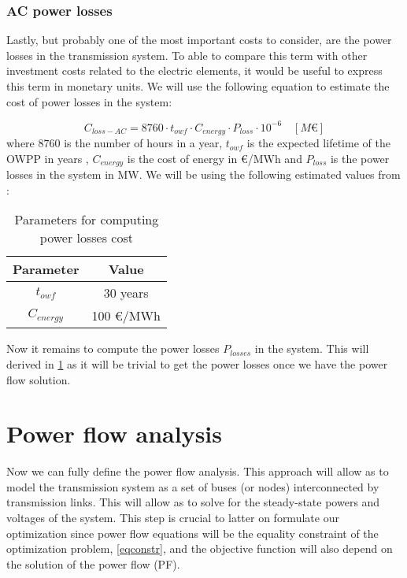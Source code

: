 \documentclass[a4paper,11pt, titlepage, twoside]{article}
\begin{document}
\subsubsection{AC power losses}
Lastly, but probably one of the most important costs to consider, are the power losses in the transmission system. To able to compare this term with other investment costs related to the electric elements,
it would be useful to express this term in monetary units. We will use the following equation to estimate the cost of power losses in the system:

\begin{equation}\label{eq:lossescost}
    C_{loss-AC} = 8760 \cdot t_{owf} \cdot C_{energy} \cdot P_{loss} \cdot 10^{-6} \quad \left[M\euro\right]
\end{equation}
where $8760$ is the number of hours in a year, $t_{owf}$ is the expected lifetime of the OWPP in years , $C_{energy}$ is the cost of energy in \euro/MWh and $P_{loss}$ is the power losses in the system in MW. We will be using the
following estimated values from \cite{paperbase}:
\begin{table}[h]
    \centering
    \begin{tabular}{c|c}
    \hline
    \textbf{Parameter} & \textbf{Value} \\
    \hline
    $t_{owf}$ & 30 years \\ 
    $C_{energy}$ & 100 \euro/MWh  \\
    \hline
    \end{tabular}
    \caption{Parameters for computing power losses cost \cite{paperbase}}
    \label{tab:lossescost}
\end{table}

Now it remains to compute the power losses $P_{losses}$ in the system. This will derived in \ref{fulltransmission} as it will be trivial to get
the power losses once we have the power flow solution.

\section{Power flow analysis} \label{fulltransmission}

Now we can fully define the power flow analysis.  This approach will allow as to model the transmission system as a set of buses (or nodes)
interconnected by transmission links. This will allow as to solve for the steady-state powers and voltages of the system. This step is crucial to latter on
formulate our optimization since power flow equations will be the equality constraint of the optimization problem, \ref{eqconstr}, and the objective function will also depend on the solution of the power flow (PF).
\end{document}
